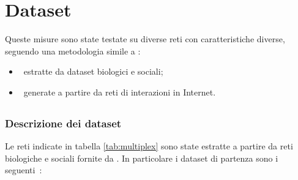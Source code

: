 \chapter{Dataset}
Queste misure sono state testate su diverse reti con caratteristiche diverse, 
seguendo una metodologia simile a \cite{basaras:infspmul}:
\begin{itemize}
    \item \Mulxs\ estratte da dataset biologici e sociali;
    \item \Mulns\ generate a partire da reti di interazioni in Internet.
\end{itemize}

\section{\Mulxs}
\subsection{Descrizione dei dataset}
Le reti indicate in tabella \vref{tab:multiplex} sono state estratte a partire da reti biologiche e
sociali fornite da \cite{data:multiplex}.
In particolare i dataset di partenza sono i seguenti~\cite{stark:biogrid}\cite{dedomenico:structred}:
